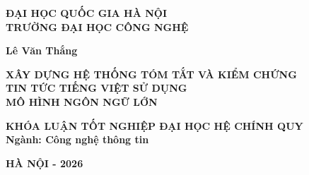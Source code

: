 \begin{titlepage}
\begin{center}

{\fontsize{12pt}{14pt}\selectfont\bfseries
ĐẠI HỌC QUỐC GIA HÀ NỘI \\
TRƯỜNG ĐẠI HỌC CÔNG NGHỆ}

\vspace{1.5cm}

{\fontsize{14pt}{16pt}\selectfont\bfseries
Lê Văn Thắng}

\vspace{3cm}

{\fontsize{18pt}{22pt}\selectfont\bfseries
XÂY DỰNG HỆ THỐNG TÓM TẮT VÀ KIỂM CHỨNG \\
TIN TỨC TIẾNG VIỆT SỬ DỤNG \\
MÔ HÌNH NGÔN NGỮ LỚN}

\vspace{3cm}

{\fontsize{14pt}{16pt}\selectfont\bfseries
KHÓA LUẬN TỐT NGHIỆP ĐẠI HỌC HỆ CHÍNH QUY \\[0.5cm]
Ngành: Công nghệ thông tin}

\vspace{2cm}

\begin{flushleft}


\end{flushleft}

\vfill

{\fontsize{12pt}{14pt}\selectfont\bfseries
HÀ NỘI - 2026}

\end{center}
\end{titlepage}
